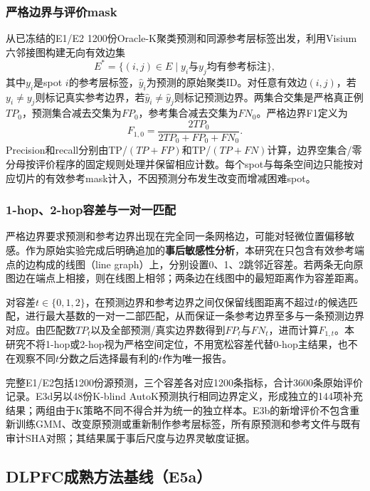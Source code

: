 \subsubsection{严格边界与评价mask}
从已冻结的E1/E2 1200份Oracle-K聚类预测和同源参考层标签出发，利用Visium六邻接图构建无向有效边集
\begin{equation}
E^\ast=\{(i,j)\in E\mid y_i\text{与}y_j\text{均有参考标注}\},
\end{equation}
其中$y_i$是spot $i$的参考层标签，$\hat{y}_i$为预测的原始聚类ID。对任意有效边$(i,j)$，若$y_i\ne y_j$则标记真实参考边界，若$\hat{y}_i\ne\hat{y}_j$则标记预测边界。两集合交集是严格真正例$TP_0$，预测集合减去交集为$FP_0$，参考集合减去交集为$FN_0$。严格边界F1定义为
\begin{equation}
F_{1,0}=\frac{2TP_0}{2TP_0+FP_0+FN_0}.
\label{eq:cc-boundary-f1-v1}
\end{equation}
Precision和recall分别由TP/$(TP+FP)$和TP/$(TP+FN)$计算，边界空集合/零分母按评价程序的固定规则处理并保留相应计数。每个spot与每条空间边只能按对应切片的有效参考mask计入，不因预测分布发生改变而增减困难spot。

\subsubsection{1-hop、2-hop容差与一对一匹配}
严格边界要求预测和参考边界出现在完全同一条网格边，可能对轻微位置偏移敏感。作为原始实验完成后明确追加的\textbf{事后敏感性分析}，本研究在只包含有效参考端点的边构成的线图（line graph）上，分别设置0、1、2跳邻近容差。若两条无向原图边在端点上相接，则在线图上相邻；两条边在线图中的最短距离作为容差距离。

对容差$t\in\{0,1,2\}$，在预测边界和参考边界之间仅保留线图距离不超过$t$的候选匹配，进行最大基数的一对一二部匹配，从而保证一条参考边界至多与一条预测边界对应。由匹配数$TP_t$以及全部预测/真实边界数得到$FP_t$与$FN_t$，进而计算$F_{1,t}$。本研究不将1-hop或2-hop视为严格空间定位，不用宽松容差代替0-hop主结果，也不在观察不同$t$分数之后选择最有利的$t$作为唯一报告。

完整E1/E2包括1200份源预测，三个容差各对应1200条指标，合计3600条原始评价记录。E3d另以48份K-blind AutoK预测执行相同边界定义，形成独立的144项补充结果；两组由于K策略不同不得合并为统一的独立样本。E3b的新增评价不包含重新训练GMM、改变原预测或重新制作参考层标签，所有原预测和参考文件与既有审计SHA对照；其结果属于事后尺度与边界灵敏度证据。

\subsection{DLPFC成熟方法基线（E5a）}
\label{subsec:cc-e5a-v1}

